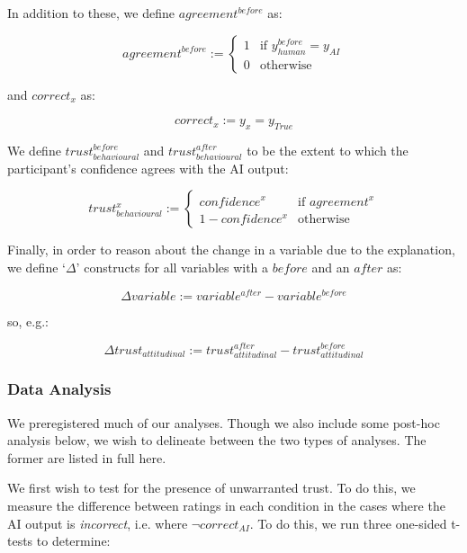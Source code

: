 In addition to these, we define $agreement^{before}$ as:

\begin{equation}
    agreement^{before} := \begin{cases}
        1 & \text{if } y_{human}^{before} = y_{AI} \\
        0 & \text{otherwise}
    \end{cases}
\end{equation}

\noindent and $correct_{x}$ as:

\begin{equation}
    correct_{x} := y_{x} = y_{True}
\end{equation}

We define $trust_{behavioural}^{before}$ and $trust_{behavioural}^{after}$ to be the extent to which the participant's confidence agrees with the AI output:

\begin{equation}
    trust_{behavioural}^{x} := \begin{cases}
        confidence^{x}      & \text{if } agreement^{x} \\
        1-confidence^{x}    & \text{otherwise}
    \end{cases}
\end{equation}

Finally, in order to reason about the change in a variable due to the explanation, we define `$\Delta$' constructs for all variables with a $before$ and an $after$ as:

\begin{equation}
    \Delta variable := variable^{after} - variable^{before}
\end{equation}

\noindent so, e.g.:

\begin{equation}
    \Delta trust_{attitudinal} := trust_{attitudinal}^{after} - trust_{attitudinal}^{before}
\end{equation}

\subsubsection{Data Analysis}
We preregistered much of our analyses. Though we also include some post-hoc analysis below, we wish to delineate between the two types of analyses. The former are listed in full here.

We first wish to test for the presence of unwarranted trust. To do this, we measure the difference between ratings in each condition in the cases where the AI output is \textit{incorrect}, i.e. where $\neg correct_{AI}$. To do this, we run three one-sided t-tests \cite{caldwell_power_nodate} to determine:

